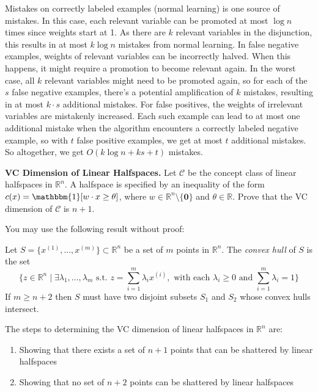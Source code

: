 \documentclass[11pt]{article}
\newcommand*{\C}{{\mathcal C}}
\newcommand*{\R}{\mathbb{R}}
\DeclareMathOperator{\1}{\mathbbm{1}}
\begin{document}
Mistakes on correctly labeled examples (normal learning) is one source of mistakes. In this case, each relevant variable can be promoted at most $\log n$ times since weights start at 1. As there are $k$ relevant variables in the disjunction, this results in at most $k \log n$ mistakes from normal learning. In false negative examples, weights of relevant variables can be incorrectly halved. When this happens, it might require a promotion to become relevant again. In the worst case, all $k$ relevant variables might need to be promoted again, so for each of the $s$ false negative examples, there's a potential amplification of $k$ mistakes, resulting in at most $k \cdot s$ additional mistakes. For false positives, the weights of irrelevant variables are mistakenly increased. Each such example can lead to at most one additional mistake when the algorithm encounters a correctly labeled negative example, so with $t$ false positive examples, we get at most $t$ additional mistakes. So altogether, we get $O(k \log n + ks + t)$ mistakes.


\begin{problem} [15pts] \textbf{VC Dimension of Linear Halfspaces.}
	Let $\C$ be the concept class of linear halfspaces in $\R^n$. A halfspace is specified by an inequality of the form $c(x) = \1[w \cdot x \geq \theta]$, where $w \in \R^n\setminus\{\mathbf{0}\}$ and $\theta \in \R$. Prove that the VC dimension of $\C$ is $n+1$.
\end{problem}
\begin{note}
	You may use the following result without proof:
	\begin{theorem}
		Let $S =
		\{x^{(1)},\dots,x^{(m)}\} \subset \R^n$ be a set of $m$
		points in $\R^n.$  The {\em convex hull} of $S$ is the set
		\[
		\{ z \in \R^n \mid \exists \lambda_1,\ldots,\lambda_m \text{\ s.t.\ } z = \sum_{i=1}^m \lambda_i x^{(i)}, \text{\ with each\ }\lambda_i \geq 0 \text{\ and\ } \sum_{i=1}^m \lambda_i = 1\}
		\] 
		If $m \geq n+2$ then $S$ must have two disjoint subsets
		$S_1$ and $S_2$ whose convex hulls intersect.
	\end{theorem}
\end{note}

The steps to determining the VC dimension of linear halfspaces in $\mathbb{R}^n$ are:
\begin{enumerate}
	\item Showing that there exists a set of $n+1$ points that can be shattered by linear halfspaces
	\item Showing that no set of $n+2$ points can be shattered by linear halfspaces
\end{enumerate}
\end{document}
